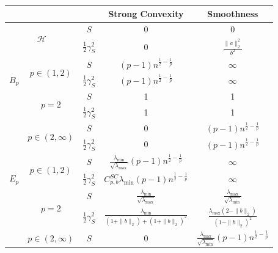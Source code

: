 \documentclass[sn-mathphys,Numbered]{sn-jnl}%
\begin{document}
\begin{table}[t]
\centering
\begin{tabular}{|cc|c|c|c|}
\hline
\multicolumn{1}{|c}{}                     & &    &  Strong Convexity&  Smoothness\\ \hline\hline
\multicolumn{2}{|c|}{\multirow{2}{*}{$\mathcal{H}$}}                     &  \multicolumn{1}{c|}{$S$}    & 0 &0
\\
\multicolumn{2}{|c|}{}                     &  \multicolumn{1}{c|}{$\frac{1}{2}\gamma^2_S$}    & 0 &$\frac{\|a\|_2^2}{b^2}$ \\
\hline
\multicolumn{1}{|c|}{\multirow{3}{*}{\vspace{-1.7cm} $B_p$}} &   \multicolumn{1}{c|}{\multirow{2}{*}{$p\in (1,2)$}}&   $S$&  $(p-1)n^{\frac{1}{2}-\frac{1}{p}}$&$\infty$  \\ 
\multicolumn{1}{|c|}{} & \multicolumn{1}{c|}{} & $\frac{1}{2}\gamma^2_S$& $(p-1)n^{\frac{1}{2}-\frac{1}{p}}$ &$\infty$ \\ 
\multicolumn{1}{|c|}{}                  &  \multirow{2}{*}{$p=2$}&    $S$&  1& 1 \\ 
\multicolumn{1}{|c|}{} & \multicolumn{1}{c|}{} & $\frac{1}{2}\gamma^2_S$ &1 &1 \\ 
\multicolumn{1}{|c|}{}                  &  \multirow{2}{*}{$p\in (2,\infty)$}&    $S$& 0 & $(p-1)n^{\frac{1}{2}-\frac{1}{p}}$\\
\multicolumn{1}{|c|}{} & \multicolumn{1}{c|}{} & $\frac{1}{2}\gamma^2_S$ &0 &$(p-1)n^{\frac{1}{2}-\frac{1}{p}}$ \\ \hline
\multicolumn{1}{|c|}{\multirow{3}{*}{\vspace{-2cm} $E_p$}} &   \multicolumn{1}{c|}{\multirow{2}{*}{$p\in (1,2)$}}&   $S$&  $\frac{\lambda_{\min}}{\sqrt{\lambda_{\max}}}(p-1)n^{\frac{1}{2}-\frac{1}{p}}$&$\infty$  \\ 
\multicolumn{1}{|c|}{} & \multicolumn{1}{c|}{} & $\frac{1}{2}\gamma^2_S$&$C^{SC}_{p,b}\lambda_{\min}(p-1)n^{\frac{1}{2}-\frac{1}{p}}$ &$\infty$ \\ 
\multicolumn{1}{|c|}{}                  &  \multirow{2}{*}{$p=2$}&    $S$&  $\frac{\lambda_{\min}}{\sqrt{\lambda_{\max}}}$& $\frac{\lambda_{\max}}{\sqrt{\lambda_{\min}}}$ \\ 
\multicolumn{1}{|c|}{} & \multicolumn{1}{c|}{} & $\frac{1}{2}\gamma^2_S$ &$\frac{\lambda_{\min}}{(1+\|b\|_2)+(1+\|b\|_2)^2}$ &$\frac{\lambda_{\max}(2-\|b\|_2)}{(1-\|b\|_2)^2}$ \\ 
\multicolumn{1}{|c|}{}                  &  \multirow{2}{*}{$p\in (2,\infty)$}&    $S$& 0 & $\frac{\lambda_{\max}}{\sqrt{\lambda_{\min}}}(p-1)n^{\frac{1}{2}-\frac{1}{p}}$\\

\end{tabular}
\end{table}
\end{document}
